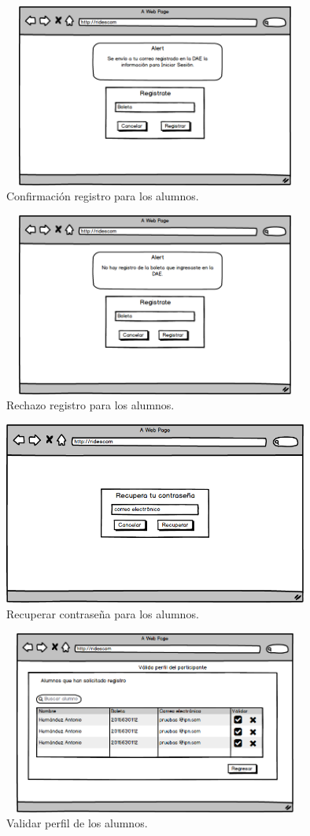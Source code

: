 	\begin{figure}[hbt!]
		\centering
		\includegraphics[width=10cm, height=6cm]{Imagenes/Disenos/VistasBorradas/ConfirmacionRegistro.png}
		\caption{Confirmación registro para los alumnos.}
	\end{figure}
	
	\begin{figure}[hbt!]
		\centering
		\includegraphics[width=10cm, height=6cm]{Imagenes/Disenos/VistasBorradas/p3RechazoRegistro.png}
		\caption{Rechazo registro para los alumnos.}
	\end{figure}

	\begin{figure}[hbt!]
		\centering
		\includegraphics[width=10cm, height=6cm]{Imagenes/Disenos/VistasBorradas/p5Recuperarcontrasena.png}
		\caption{Recuperar contraseña para los alumnos.}
	\end{figure}

	\begin{figure}[hbt!]
		\centering
		\includegraphics[width=10cm, height=6cm]{Imagenes/Disenos/VistasBorradas/p18ValidaPerfil.png}
		\caption{Validar perfil de los alumnos.}
	\end{figure}
	\pagebreak

	